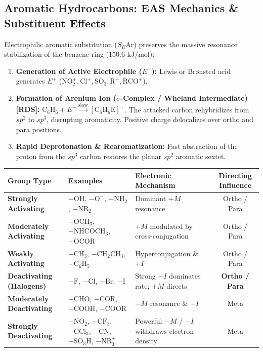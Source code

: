 \documentclass[10pt,a4paper]{article}
\begin{document}
\subsection{Aromatic Hydrocarbons: EAS Mechanics \& Substituent Effects}

\begin{conceptbox}
Electrophilic aromatic substitution ($S_E\mathrm{Ar}$) preserves the massive resonance stabilization of the benzene ring ($150.6\text{ kJ/mol}$):
\begin{enumerate}[leftmargin=*]
  \item \textbf{Generation of Active Electrophile ($E^+$):} Lewis or Br{\o}nsted acid generates $E^+$ ($\mathrm{NO_2^+, Cl^+, SO_3, R^+, RCO^+}$).
  \item \textbf{Formation of Arenium Ion ($\sigma$-Complex / Wheland Intermediate) [RDS]:} $\mathrm{C_6H_6} + E^+ \xrightarrow{\text{slow}} [\mathrm{C_6H_6E}]^+$. The attacked carbon rehybridizes from $sp^2$ to $sp^3$, disrupting aromaticity. Positive charge delocalizes over ortho and para positions.
  \item \textbf{Rapid Deprotonation \& Rearomatization:} Fast abstraction of the proton from the $sp^3$ carbon restores the planar $sp^2$ aromatic sextet.
\end{enumerate}
\end{conceptbox}

\begin{formulabox}
\begin{tabularx}{\linewidth}{|p{3.0cm}|p{4.2cm}|Y|c|}
\hline
\textbf{Group Type} & \textbf{Examples} & \textbf{Electronic Mechanism} & \textbf{Directing Influence} \\
\hline
\textbf{Strongly Activating} & $-\mathrm{OH}$, $-\mathrm{O^-}$, $-\mathrm{NH_2}$, $-\mathrm{NR_2}$ & Dominant $+M$ resonance & Ortho / Para \\
\hline
\textbf{Moderately Activating} & $-\mathrm{OCH_3}$, $-\mathrm{NHCOCH_3}$, $-\mathrm{OCOR}$ & $+M$ modulated by cross-conjugation & Ortho / Para \\
\hline
\textbf{Weakly Activating} & $-\mathrm{CH_3}$, $-\mathrm{CH_2CH_3}$, $-\mathrm{C_6H_5}$ & Hyperconjugation \& $+I$ & Ortho / Para \\
\hline
\textbf{Deactivating (Halogens)} & $-\mathrm{F}$, $-\mathrm{Cl}$, $-\mathrm{Br}$, $-\mathrm{I}$ & Strong $-I$ dominates rate; $+M$ directs & \textbf{Ortho / Para} \\
\hline
\textbf{Moderately Deactivating} & $-\mathrm{CHO}$, $-\mathrm{COR}$, $-\mathrm{COOH}$, $-\mathrm{COOR}$ & $-M$ resonance \& $-I$ & Meta \\
\hline
\textbf{Strongly Deactivating} & $-\mathrm{NO_2}$, $-\mathrm{CF_3}$, $-\mathrm{CCl_3}$, $-\mathrm{CN}$, $-\mathrm{SO_3H}$, $-\mathrm{NR_3^+}$ & Powerful $-M$ / $-I$ withdraws electron density & Meta \\
\hline
\end{tabularx}
\end{formulabox}
\end{document}
